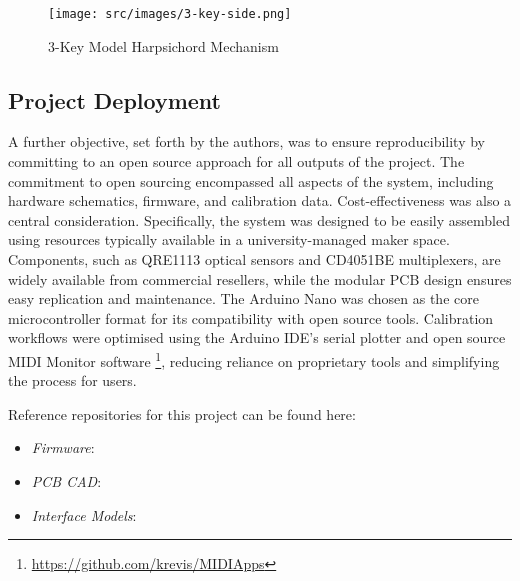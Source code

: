 \begin{figure}[!t]
    \centering    
    \texttt{[image: src/images/3-key-side.png]}
    \caption{
    3-Key Model Harpsichord Mechanism    
    }
    \label{fig:3key}
\end{figure}

\subsection{Project Deployment}

A further objective, set forth by the authors, was to ensure reproducibility by committing to an open source approach for all outputs of the project. The commitment to open sourcing encompassed all aspects of the system, including hardware schematics, firmware, and calibration data. Cost-effectiveness was also a central consideration. 
Specifically, the system was designed to be easily assembled using resources typically available in a university-managed maker space. Components, such as QRE1113 optical sensors and CD4051BE multiplexers, are widely available from commercial resellers, while the modular PCB design ensures easy replication and maintenance. The Arduino Nano was chosen as the core microcontroller format for its compatibility with open source tools. Calibration workflows were optimised using the Arduino IDE’s serial plotter and open source MIDI Monitor software \footnote{\url{https://github.com/krevis/MIDIApps}}, reducing reliance on proprietary tools and simplifying the process for users. 




\begin{anonsuppress}
Reference repositories for this project can be found here:

    \begin{itemize}
        \item 
        \emph{Firmware}: 
        \item 
        \emph{PCB CAD}: 
        \item 
        \emph{Interface Models}: 
    \end{itemize}
\end{anonsuppress}


